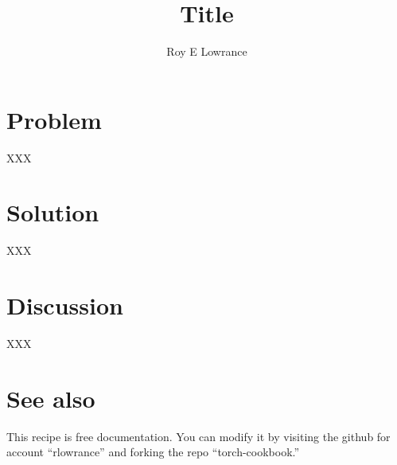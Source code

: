 \documentclass{article}
\begin{document}
\title{Title}
\author{Roy E Lowrance}
\maketitle


\section{Problem}

XXX

\section{Solution}

XXX

\section{Discussion}

XXX

\section{See also}

This recipe is free documentation. You can modify it by visiting the
github for account ``rlowrance'' and forking the repo
``torch-cookbook.''
\end{document}
